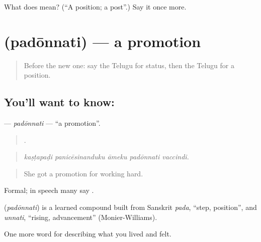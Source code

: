 \begin{tcolorbox}[breakable,colback=teal!4,colframe=teal!35!black,title={Before you move on}]
What does  mean? (\textquotedblleft{}A position; a post\textquotedblright{}.) Say it once more.
\end{tcolorbox}
\section[\texorpdfstring{\te{పదోన్నతి} (padōnnati)}{పదోన్నతి (padōnnati)}]{ (padōnnati) — a promotion}

\label{lesson:TE-C522-padonnati}



\begin{quote}
Before the new one: say the Telugu for status, then the Telugu for a position.
\end{quote}

\subsection*{You'll want to know: }
\textbf{} — \emph{padōnnati} — \textquotedblleft{}a promotion\textquotedblright{}.

\begin{quote}
    .
\end{quote}

\begin{quote}
\emph{kaṣṭapaḍi panicēsinanduku āmeku padōnnati vaccindi.}
\end{quote}

\begin{quote}
She got a promotion for working hard.
\end{quote}

Formal; in speech many say .

\begin{cousinweb}
\textbf{} (\emph{padōnnati}) is a learned compound built from Sanskrit \emph{pada}, \textquotedblleft{}step, position\textquotedblright{}, and \emph{unnati}, \textquotedblleft{}rising, advancement\textquotedblright{} (Monier-Williams).
\end{cousinweb}

\begin{grammarlens}[title={What you've built}]
One more word for describing what you lived and felt.
\end{grammarlens}

